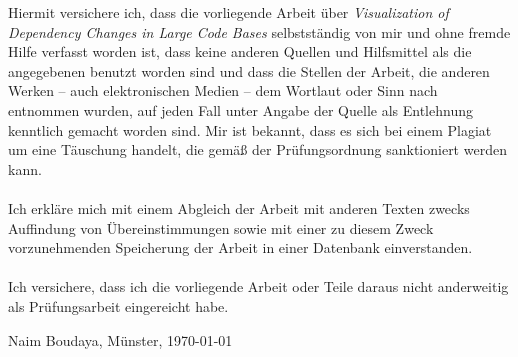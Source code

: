 \documentclass{article}
\begin{document}
Hiermit versichere ich, dass die vorliegende Arbeit über \textit{\glqq Visualization of Dependency Changes in Large Code Bases \grqq} selbstständig von mir und ohne fremde Hilfe verfasst worden ist, dass keine anderen Quellen und Hilfsmittel als die angegebenen benutzt worden sind und dass die Stellen der Arbeit, die anderen Werken – auch elektronischen Medien – dem Wortlaut oder Sinn nach entnommen wurden, auf jeden Fall unter Angabe der Quelle als Entlehnung kenntlich gemacht worden sind. Mir ist bekannt, dass es sich bei einem Plagiat um eine Täuschung handelt, die gemäß der Prüfungsordnung sanktioniert werden kann.
\\\\Ich erkläre mich mit einem Abgleich der Arbeit mit anderen Texten zwecks Auffindung von Übereinstimmungen sowie mit einer zu diesem Zweck vorzunehmenden Speicherung der Arbeit in einer Datenbank einverstanden.
\\\\Ich versichere, dass ich die vorliegende Arbeit oder Teile daraus nicht anderweitig als Prüfungsarbeit eingereicht habe.

\vspace{1cm}

\noindent
\parbox{20em}{\hrulefill}

\noindent
Naim Boudaya, Münster, \today
\end{document}
